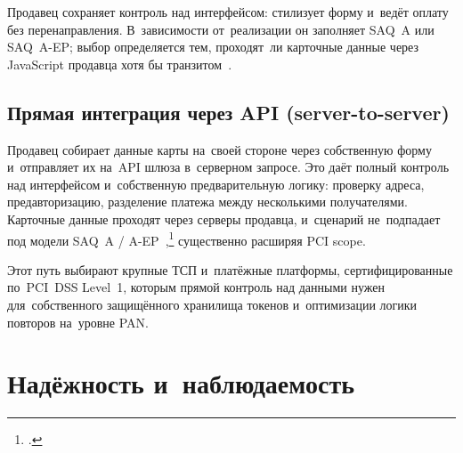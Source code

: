 Продавец сохраняет контроль над интерфейсом: стилизует форму и~ведёт оплату
без перенаправления. В~зависимости от~реализации он заполняет
SAQ~A или SAQ~A-EP; выбор определяется тем, проходят~ли карточные данные через
JavaScript продавца хотя бы транзитом~\cite{pci-faq-1291,pci-faq-1293}.


\subsection*{Прямая интеграция через API (server-to-server)}

Продавец собирает данные карты на~своей стороне через собственную форму
и~отправляет их на~API шлюза в~серверном запросе. Это даёт полный контроль над
интерфейсом и~собственную предварительную логику: проверку адреса,
предавторизацию, разделение платежа между несколькими получателями. Карточные
данные проходят через серверы продавца, и~сценарий не~подпадает под модели
SAQ~A / A-EP~\cite{pci-saq},\footnote{\cite{pci-faq-1291,pci-faq-1293}.} существенно расширяя PCI
scope.

Этот путь выбирают крупные ТСП и~платёжные платформы, сертифицированные
по~PCI~DSS Level~1, которым прямой контроль над данными нужен для~собственного
защищённого хранилища токенов и~оптимизации логики повторов на~уровне PAN.


\section{Надёжность и~наблюдаемость}\label{sec:gw-reliability}

